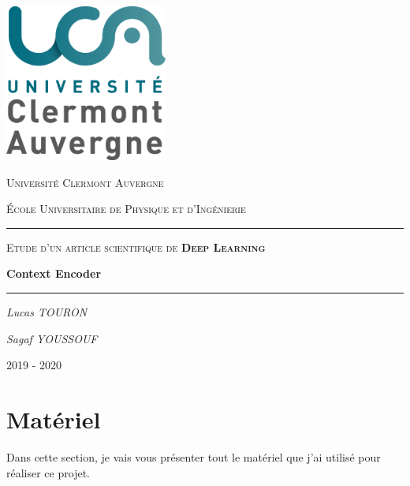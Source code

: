\documentclass[11pt,a4paper]{article}
\begin{document}
\begin{titlepage}
	\centering
	\includegraphics[width=0.40\textwidth]{uca.png}\par\vspace{1cm}
	{\scshape\LARGE Université Clermont Auvergne \par}
	{\scshape École Universitaire de Physique et d'Ingénierie \par}
	\vspace{2cm}
	\noindent\rule{\textwidth}{0.5pt}\par
	{\scshape\Large Etude d'un article scientifique de \textbf{Deep Learning}\par}
	\vspace{0.5cm}
	{\huge\bfseries Context Encoder\par}
	\noindent\rule{\textwidth}{0.5pt}\par
	\vspace{4cm}
	{\Large\itshape Lucas TOURON\par}
	{\Large\itshape Sagaf YOUSSOUF\par}

	\vfill

	{\large 2019 - 2020\par}
\end{titlepage}

\tableofcontents
\newpage

\section{Matériel}
Dans cette section, je vais vous présenter tout le matériel que j'ai utilisé pour réaliser ce projet.
\end{document}
